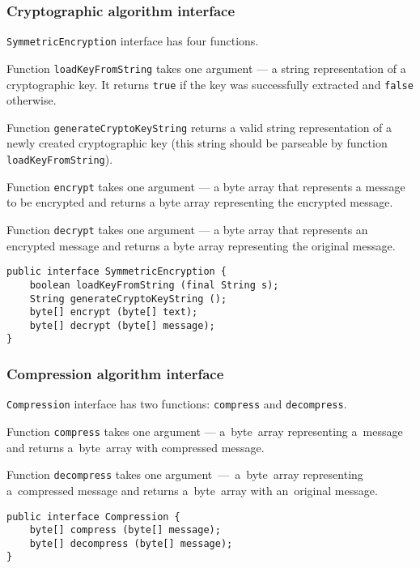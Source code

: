 \subsubsection{Cryptographic algorithm interface}
\texttt{SymmetricEncryption} interface has four functions.

Function \texttt{loadKeyFromString} takes one argument --- 
a string representation of a cryptographic key. It returns
\texttt{true} if the key was successfully extracted and
\texttt{false} otherwise.

Function \texttt{generateCryptoKeyString} returns a 
valid string representation of a newly created cryptographic key 
(this string should be parseable by function \texttt{loadKeyFromString}).

Function \texttt{encrypt} takes one argument --- a byte array that represents
a message to be encrypted and returns a byte array representing the encrypted
message.

Function \texttt{decrypt} takes one argument --- a byte array that represents
an encrypted message and returns a byte array representing the original message.

\begin{lstlisting}
public interface SymmetricEncryption {
    boolean loadKeyFromString (final String s);
    String generateCryptoKeyString ();
    byte[] encrypt (byte[] text);
    byte[] decrypt (byte[] message);
}
\end{lstlisting}

\subsubsection{Compression algorithm interface}

\texttt{Compression} interface has two functions:
\texttt{compress} and \texttt{decompress}. 

Function \texttt{compress}
takes one argument --- a~byte~array representing a~message and returns
a~byte~array with compressed message. 

Function \texttt{decompress}
takes one argument~---~a~byte~array representing a~compressed message
and returns a~byte~array with an~original message.

\begin{lstlisting} 
public interface Compression {
    byte[] compress (byte[] message);
    byte[] decompress (byte[] message);
}
\end{lstlisting}
